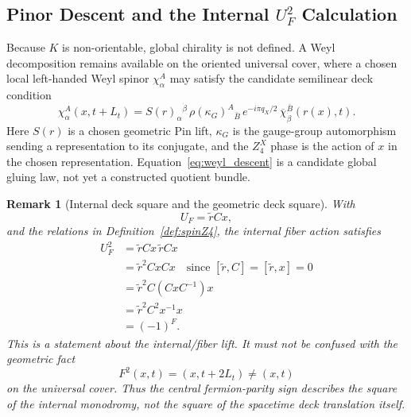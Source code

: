 \documentclass[11pt]{article}
\theoremstyle{canonmath}
\newtheorem{remark}[theorem]{Remark}
\theoremstyle{canonpostulate}
\theoremstyle{canonclaim}
\providecommand{\Klein}{\mathcal{K}}
\def\mathbb#1{#1}%
\def\mathcal#1{#1}%
\begin{document}
\subsection{Pinor Descent and the Internal \texorpdfstring{$U_F^2$}{UF squared} Calculation}

Because $\Klein$ is non-orientable, global chirality is not defined. A Weyl decomposition remains available on the oriented universal cover, where a chosen local left-handed Weyl spinor $\chi_\alpha^A$ may satisfy the candidate semilinear deck condition
\begin{equation}
\chi_\alpha^A(x,t+L_t)
=
S(r)_\alpha{}^{\dot\beta}
\,\rho(\kappa_G)^A{}_{\bar B}
\,e^{-i\pi q_X/2}
\,\overline{\chi}_{\dot\beta}^{\bar B}(r(x),t).
\label{eq:weyl_descent}
\end{equation}
Here $S(r)$ is a chosen geometric Pin lift, $\kappa_G$ is the gauge-group automorphism sending a representation to its conjugate, and the $\mathbb Z_4^X$ phase is the action of $x$ in the chosen representation. Equation~\eqref{eq:weyl_descent} is a candidate global gluing law, not yet a constructed quotient bundle.

\begin{remark}[Internal deck square and the geometric deck square] \label{rem:F2}
With
\begin{equation}
U_F=\widetilde r Cx,
\end{equation}
and the relations in Definition~\ref{def:spinZ4}, the internal fiber action satisfies
\begin{align}
U_F^2
&=\widetilde r Cx\,\widetilde r Cx\\
&=\widetilde r^2 CxCx
\quad\text{since }[\widetilde r,C]=[\widetilde r,x]=0\\
&=\widetilde r^2 C(CxC^{-1})x\\
&=\widetilde r^2 C^2 x^{-1}x\\
&=(-1)^F.
\end{align}
This is a statement about the internal/fiber lift. It must not be confused with the geometric fact
\begin{equation}
F^2(x,t)=(x,t+2L_t)\neq(x,t)
\end{equation}
on the universal cover. Thus the central fermion-parity sign describes the square of the internal monodromy, not the square of the spacetime deck translation itself.
\end{remark}
\end{document}
